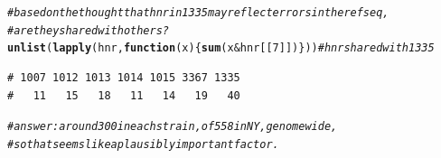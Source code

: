 \documentclass{article}\usepackage[]{graphicx}\usepackage[]{color}
\makeatletter
\newcommand{\hlnum}[1]{\textcolor[rgb]{0.686,0.059,0.569}{#1}}%
\newcommand{\hlcom}[1]{\textcolor[rgb]{0.678,0.584,0.686}{\textit{#1}}}%
\newcommand{\hlopt}[1]{\textcolor[rgb]{0,0,0}{#1}}%
\newcommand{\hlstd}[1]{\textcolor[rgb]{0.345,0.345,0.345}{#1}}%
\newcommand{\hlkwa}[1]{\textcolor[rgb]{0.161,0.373,0.58}{\textbf{#1}}}%
\newcommand{\hlkwc}[1]{\textcolor[rgb]{0.333,0.667,0.333}{#1}}%
\newcommand{\hlkwd}[1]{\textcolor[rgb]{0.737,0.353,0.396}{\textbf{#1}}}%
\newenvironment{kframe}{%
 \def\at@end@of@kframe{}%
 \ifinner\ifhmode%
  \def\at@end@of@kframe{\end{minipage}}%
  \begin{minipage}{\columnwidth}%
 \fi\fi%
 \def\FrameCommand##1{\hskip\@totalleftmargin \hskip-\fboxsep
 \colorbox{shadecolor}{##1}\hskip-\fboxsep
     \hskip-\linewidth \hskip-\@totalleftmargin \hskip\columnwidth}%
 \MakeFramed {\advance\hsize-\width
   \@totalleftmargin\z@ \linewidth\hsize
   \@setminipage}}%
 {\par\unskip\endMakeFramed%
 \at@end@of@kframe}
\newenvironment{knitrout}{}{} %
\makeatother
\begin{document}
\begin{knitrout}\footnotesize
{}\color{fgcolor}\begin{kframe}
\begin{alltt}
\hlcom{# based on the thought that hnr in 1335 may reflect errors in the ref seq, }
\hlcom{# are they shared with others?}
\hlkwd{unlist}\hlstd{(}\hlkwd{lapply}\hlstd{(hnr,} \hlkwa{function}\hlstd{(}\hlkwc{x}\hlstd{)\{}\hlkwd{sum}\hlstd{(x} \hlopt{&} \hlstd{hnr[[}\hlnum{7}\hlstd{]])\}))}                 \hlcom{# hnr shared with 1335}
\end{alltt}
\begin{verbatim}
# 1007 1012 1013 1014 1015 3367 1335 
#   11   15   18   11   14   19   40
\end{verbatim}
\begin{alltt}
\hlcom{# answer: around 300 in each strain, of 558 in NY, genomewide, }
\hlcom{# so that seems like a plausibly important factor.}


\end{alltt}
\end{kframe}
\end{knitrout}
\end{document}
